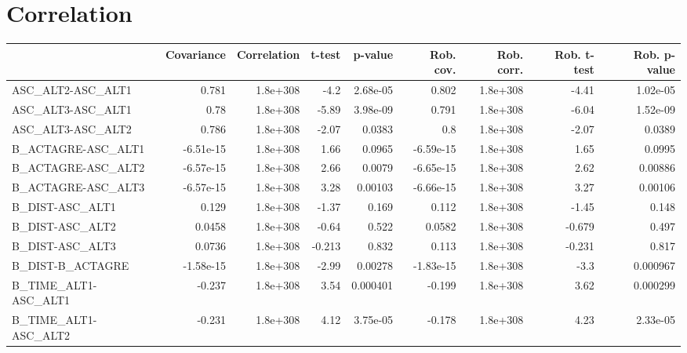 \section{Correlation}
\begin{tabular}{lrrrrrrrr}
\toprule
{} &  Covariance &  Correlation &    t-test &  p-value &  Rob. cov. &  Rob. corr. &  Rob. t-test &  Rob. p-value \\
\midrule
ASC\_ALT2-ASC\_ALT1                 &       0.781 &     1.8e+308 &      -4.2 & 2.68e-05 &      0.802 &    1.8e+308 &        -4.41 &      1.02e-05 \\
ASC\_ALT3-ASC\_ALT1                 &        0.78 &     1.8e+308 &     -5.89 & 3.98e-09 &      0.791 &    1.8e+308 &        -6.04 &      1.52e-09 \\
ASC\_ALT3-ASC\_ALT2                 &       0.786 &     1.8e+308 &     -2.07 &   0.0383 &        0.8 &    1.8e+308 &        -2.07 &        0.0389 \\
B\_ACTAGRE-ASC\_ALT1                &   -6.51e-15 &     1.8e+308 &      1.66 &   0.0965 &  -6.59e-15 &    1.8e+308 &         1.65 &        0.0995 \\
B\_ACTAGRE-ASC\_ALT2                &   -6.57e-15 &     1.8e+308 &      2.66 &   0.0079 &  -6.65e-15 &    1.8e+308 &         2.62 &       0.00886 \\
B\_ACTAGRE-ASC\_ALT3                &   -6.57e-15 &     1.8e+308 &      3.28 &  0.00103 &  -6.66e-15 &    1.8e+308 &         3.27 &       0.00106 \\
B\_DIST-ASC\_ALT1                   &       0.129 &     1.8e+308 &     -1.37 &    0.169 &      0.112 &    1.8e+308 &        -1.45 &         0.148 \\
B\_DIST-ASC\_ALT2                   &      0.0458 &     1.8e+308 &     -0.64 &    0.522 &     0.0582 &    1.8e+308 &       -0.679 &         0.497 \\
B\_DIST-ASC\_ALT3                   &      0.0736 &     1.8e+308 &    -0.213 &    0.832 &      0.113 &    1.8e+308 &       -0.231 &         0.817 \\
B\_DIST-B\_ACTAGRE                  &   -1.58e-15 &     1.8e+308 &     -2.99 &  0.00278 &  -1.83e-15 &    1.8e+308 &         -3.3 &      0.000967 \\
B\_TIME\_ALT1-ASC\_ALT1              &      -0.237 &     1.8e+308 &      3.54 & 0.000401 &     -0.199 &    1.8e+308 &         3.62 &      0.000299 \\
B\_TIME\_ALT1-ASC\_ALT2              &      -0.231 &     1.8e+308 &      4.12 & 3.75e-05 &     -0.178 &    1.8e+308 &         4.23 &      2.33e-05 \\

\end{tabular}
